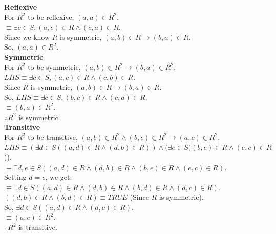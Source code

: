 \documentclass[a4paper]{article}
\begin{document}
\begin{enumerate}
\begin{enumerate}
        \textbf{Reflexive}\\
        For $R^2$ to be reflexive, $(a, a) \in R^2$.\\
        $\equiv \exists c \in S, (a, c) \in R \land (c, a) \in R$.\\
        Since we know $R$ is symmetric, $(a, b) \in R \rightarrow (b, a) \in R$.\\
        So, $(a, a) \in R^2$.\\

        \textbf{Symmetric}\\
        For $R^2$ to be symmetric, $(a, b) \in R^2 \rightarrow (b, a) \in R^2$.\\
        $LHS \equiv \exists c \in S, (a, c) \in R \land (c, b) \in R$.\\

        Since $R$ is symmetric, $(a, b) \in R \rightarrow (b, a) \in R$.\\
        So, $LHS \equiv \exists c \in S, (b, c) \in R \land (c, a) \in R$.\\
        $\equiv (b, a) \in R^2$.\\

        $\therefore R^2$ is symmetric.\\

        \textbf{Transitive}\\
        For $R^2$ to be transitive, $(a, b) \in R^2 \land (b, c) \in R^2 \rightarrow (a, c) \in R^2$.\\
        $LHS \equiv (\exists d \in S ((a, d) \in R \land (d, b) \in R)) \land (\exists e \in S ((b, e) \in R \land (e, c) \in R$)).\\
        $\equiv \exists d, e \in S ((a, d) \in R \land (d, b) \in R \land (b, e) \in R \land (e, c) \in R)$.\\
        
        Setting $d = e$, we get:\\
        $\equiv \exists d \in S ((a, d) \in R \land (d, b) \in R \land (b, d) \in R \land (d, c) \in R)$.\\
        $((d, b) \in R \land (b, d) \in R) \equiv TRUE$ (Since $R$ is symmetric).\\
        So, $\exists d \in S ((a, d) \in R \land (d, c) \in R)$.\\
        $\equiv (a, c) \in R^2$.\\

        $\therefore R^2$ is transitive.\\


\end{enumerate}
\end{enumerate}
\end{document}
